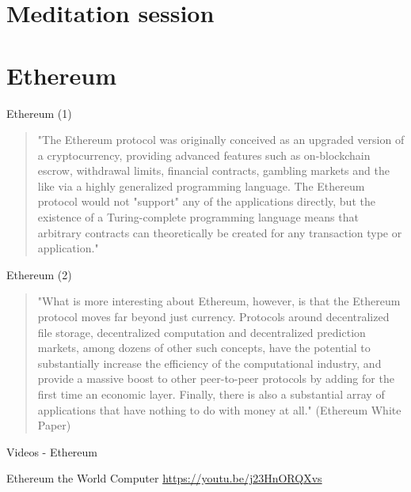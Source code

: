 \documentclass[presentation]{beamer}
\begin{document}
\section{Meditation session}
\label{sec-4}
\section{Ethereum}
\label{sec-5}
\begin{frame}[label=sec-5-1]{Ethereum (1)}
\begin{quotation}
"The Ethereum protocol was originally conceived as an upgraded version of a
cryptocurrency, providing advanced features such as on-blockchain escrow,
withdrawal limits, financial contracts, gambling markets and the like via a
highly generalized programming language. The Ethereum protocol would not
"support" any of the applications directly, but the existence of a
Turing-complete programming language means that arbitrary contracts can
theoretically be created for any transaction type or application."
\end{quotation}
\end{frame}

\begin{frame}[label=sec-5-2]{Ethereum (2)}
\begin{quotation}
"What is more interesting about Ethereum, however, is that the Ethereum protocol moves far
beyond just currency. Protocols around decentralized file storage, decentralized
computation and decentralized prediction markets, among dozens of other such
concepts, have the potential to substantially increase the efficiency of the
computational industry, and provide a massive boost to other peer-to-peer
protocols by adding for the first time an economic layer. Finally, there is also
a substantial array of applications that have nothing to do with money at all."
(Ethereum White Paper)
\end{quotation}
\end{frame}
\begin{frame}[label=sec-5-3]{Videos - Ethereum}
\begin{alertblock}{Ethereum the World Computer}
\url{https://youtu.be/j23HnORQXvs}
\end{alertblock}
\end{frame}
\end{document}
